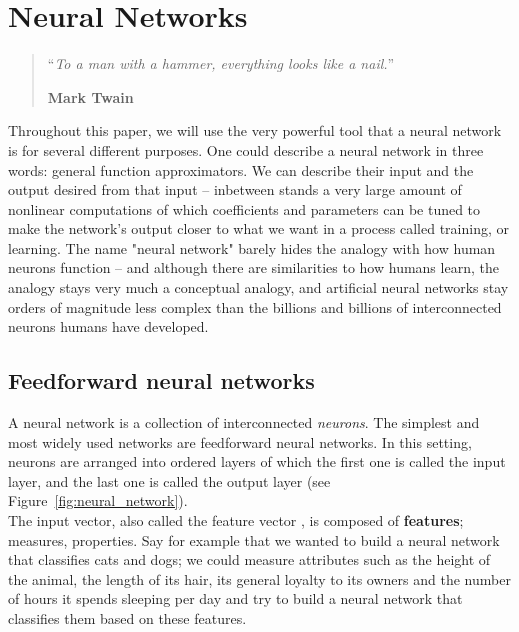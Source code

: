 \chapter{Neural Networks}
\begin{quotation}
\noindent ``\emph{To a man with a hammer, everything looks like a nail.}''
\begin{flushright}\textbf{Mark Twain}\end{flushright}
\end{quotation}

\vspace*{0.5cm}

Throughout this paper, we will use the very powerful tool that a neural network
is for several different purposes. One could describe a neural network in 
three words: general function approximators. We can describe their input
and the output desired from that input -- inbetween stands a very large amount of
nonlinear computations of which coefficients and parameters can be tuned to
make the network's output closer to what we want in a process called training, 
or learning. The name "neural network"
barely hides the analogy with how human neurons function -- and although there
are similarities to how humans learn, the analogy stays very much a conceptual
analogy, and artificial neural networks stay orders of magnitude less complex
than the billions and billions of interconnected neurons humans have developed. 

\section{Feedforward neural networks}
A neural network is a collection of interconnected \textit{neurons}. The
simplest and most widely used networks are feedforward neural networks. In this
setting, neurons are arranged into ordered layers of which the first one is
called the input layer, and the last one is called the output layer
(see Figure~\ref{fig:neural_network}).\\

The input vector, also called the feature vector ,
is composed of \textbf{features}; measures, properties. Say
for example that we wanted to build a neural network that classifies cats and
dogs; we could measure attributes such as the height of the animal, the length
of its hair, its general loyalty to its owners and the number of hours it 
spends sleeping per day and try to build a neural network that classifies
them based on these features.\\


